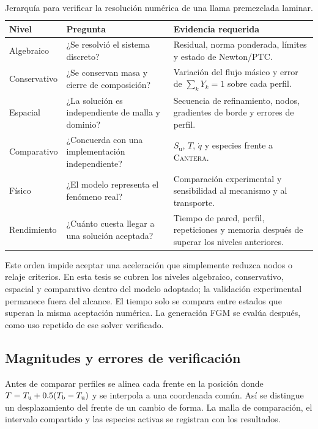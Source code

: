 \documentclass[12pt,a4paper,twoside,openany]{book}
\newcommand{\Su}{S_{\mathrm{u}}}
\newcommand{\Cantera}{\textsc{Cantera}\xspace}
\begin{document}
\begin{table}[htbp]
\centering
\caption{Jerarquía para verificar la resolución numérica de una llama
premezclada laminar.}
\label{tab:verification-hierarchy}
\begin{tabularx}{\textwidth}{@{}p{}Y Y@{}}
\toprule
\textbf{Nivel} & \textbf{Pregunta} & \textbf{Evidencia requerida} \\
\midrule
Algebraico & ¿Se resolvió el sistema discreto? & Residual, norma ponderada,
límites y estado de Newton/PTC. \\
Conservativo & ¿Se conservan masa y cierre de composición? & Variación del
flujo másico y error de \(\sum_kY_k=1\) sobre cada perfil. \\
Espacial & ¿La solución es independiente de malla y dominio? & Secuencia de
refinamiento, nodos, gradientes de borde y errores de perfil. \\
Comparativo & ¿Concuerda con una implementación independiente? & \(\Su\),
\(T\), \(\dot q\) y especies frente a \Cantera. \\
Físico & ¿El modelo representa el fenómeno real? & Comparación experimental y
sensibilidad al mecanismo y al transporte. \\
Rendimiento & ¿Cuánto cuesta llegar a una solución aceptada? & Tiempo de pared,
perfil, repeticiones y memoria después de superar los niveles anteriores. \\
\bottomrule
\end{tabularx}
\end{table}

Este orden impide aceptar una aceleración que simplemente reduzca nodos o relaje
criterios. En esta tesis se cubren los niveles algebraico, conservativo, espacial
y comparativo dentro del modelo adoptado; la validación experimental permanece
fuera del alcance. El tiempo solo se compara entre estados que superan la misma
aceptación numérica. La generación FGM se evalúa después, como uso repetido de
ese solver verificado.


\subsection{Magnitudes y errores de verificación}

Antes de comparar perfiles se alinea cada frente en la posición donde
\(T=T_{\rm u}+0.5(T_{\rm b}-T_{\rm u})\) y se interpola a una coordenada
común. Así se distingue un desplazamiento del frente de un cambio de forma.
La malla de comparación, el intervalo compartido y las especies activas se
registran con los resultados.
\end{document}
